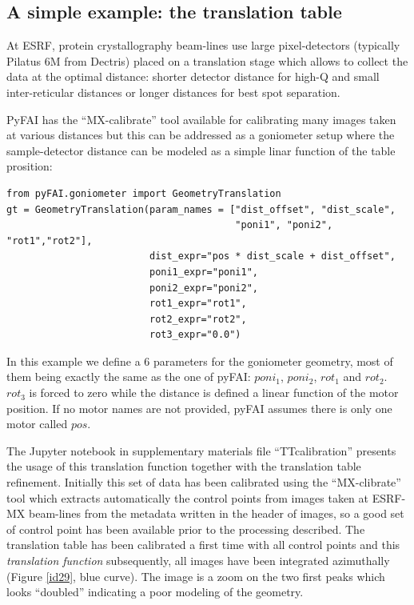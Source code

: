 \documentclass[preprint, pdf]{iucr}              %
\begin{document}
\subsection{A simple example: the translation table}

At ESRF, protein crystallography beam-lines use large pixel-detectors (typically
Pilatus 6M from Dectris) placed on a translation stage which allows to collect
the data at the optimal distance: shorter detector distance for high-Q and small
inter-reticular distances or longer distances for best spot separation.

PyFAI has the ``MX-calibrate'' tool available for calibrating many images taken
at various distances but this can be addressed as a goniometer setup where the
sample-detector distance can be modeled as a simple linar function of the table
prosition:

\begin{verbatim}
from pyFAI.goniometer import GeometryTranslation
gt = GeometryTranslation(param_names = ["dist_offset", "dist_scale", 
                                        "poni1", "poni2", "rot1","rot2"],
                         dist_expr="pos * dist_scale + dist_offset", 
                         poni1_expr="poni1",
                         poni2_expr="poni2", 
                         rot1_expr="rot1", 
                         rot2_expr="rot2", 
                         rot3_expr="0.0")
\end{verbatim}
 
In this example we define a 6 parameters for the goniometer geometry, most of
them being exactly the same as the one of pyFAI: $poni_1$, $poni_2$, $rot_1$
and $rot_2$. $rot_3$ is forced to zero while the distance is defined a linear function of the motor position.
If no motor names are not provided, pyFAI assumes there is only one motor
called $pos$.

The Jupyter notebook \cite{ipython} in supplementary materials file
``TTcalibration'' presents the usage of this translation function
together with the translation table refinement. 
Initially this set of data has been calibrated using the ``MX-clibrate'' tool
which extracts automatically the control points from images taken at ESRF-MX
beam-lines from the metadata written in the header of images, so a good set
of control point has been available prior to the processing described. 
The translation table has been calibrated a first time with all control points
and this \textit{translation function} subsequently, all images have been
integrated azimuthally (Figure \ref{id29}, blue curve). 
The image is a zoom on the two first peaks which looks ``doubled'' indicating a
poor modeling of the geometry.
\end{document}
